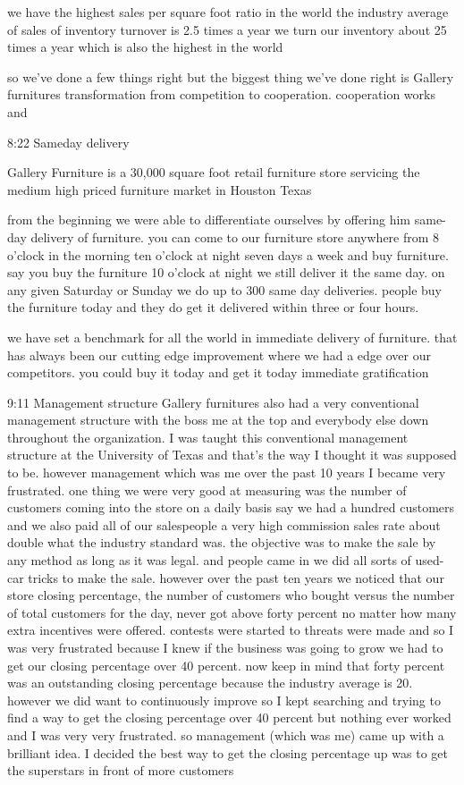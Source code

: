 \documentclass[
]{book}
\begin{document}
we have the highest sales per square foot ratio in the world the industry average of sales of inventory turnover is 2.5 times a year we turn our inventory about 25 times a year which is also the highest in the world

so we've done a few things right but the biggest thing we've done right is Gallery furnitures transformation from competition to cooperation. cooperation works and

8:22 Sameday delivery

Gallery Furniture is a 30,000 square foot retail furniture
store servicing the medium high priced furniture market in Houston Texas

from the beginning we were able to differentiate ourselves by offering him same-day delivery of furniture. you can come to our furniture store anywhere
from 8 o'clock in the morning ten o'clock at night seven days a week and buy furniture. say you buy the furniture 10 o'clock at night we still deliver it the same day. on any given Saturday or Sunday we do up to 300 same day deliveries. people buy the furniture today and they do get it delivered within three or four hours.

we have set a benchmark for all the world in immediate
delivery of furniture. that has always been our cutting edge improvement where we had a edge over our competitors. you could buy it today and get it today immediate gratification

9:11 Management structure
Gallery furnitures also had a very conventional management structure with the boss me at the top and everybody else down throughout the organization. I was taught this conventional management structure at the University of Texas and
that's the way I thought it was supposed to be. however management which was me over the past 10 years I became very frustrated. one thing we were very good at measuring was the number of customers coming into the store on a daily basis say we had a hundred customers and we also paid all of our salespeople a very high commission sales rate about double what the industry standard was. the objective was to make the sale by any method as long as it was legal. and people came in we did all sorts of used-car tricks to make the sale. however over the past ten years we noticed that our store closing percentage, the number of customers who bought versus the number of total customers for the day, never got above forty percent no matter how many extra incentives were offered. contests were started to threats were made and so I was very frustrated because I knew if the business was going to grow we had to get our closing percentage over 40 percent. now keep in mind that forty percent was an outstanding closing percentage because the industry average is 20. however we did want to continuously improve so I kept searching and trying to find a way to get the closing percentage over 40 percent but nothing ever worked and I was very very frustrated. so management (which was me) came up with a brilliant idea. I decided the best way to get the closing percentage up was to get the superstars in front of more customers
\end{document}
